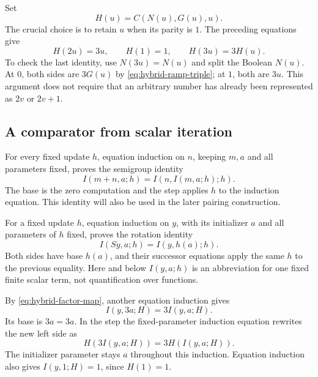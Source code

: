 \documentclass[11pt,a4paper]{article}
\theoremstyle{definition}\newtheorem{definition}[theorem]{Definition}
\begin{document}
Set
\[
 H(u)=C(N(u),G(u),u).
\]
The crucial choice is to retain $u$ when its parity is $1$.
The preceding equations give
\begin{equation}
 H(2u)=3u,\qquad H(1)=1,\qquad H(3u)=3H(u).
 \label{eq:hybrid-factor-map}
\end{equation}
To check the last identity, use $N(3u)=N(u)$ and split the Boolean
$N(u)$.  At $0$, both sides are $3G(u)$ by
\eqref{eq:hybrid-ramp-triple}; at $1$, both are $3u$.
This argument does not require that an arbitrary number has already
been represented as $2v$ or $2v+1$.

\subsection{A comparator from scalar iteration}

For every fixed update $h$, equation induction on $n$, keeping $m,a$
and all parameters fixed, proves the semigroup identity
\[
 I(m+n,a;h)=I(n,I(m,a;h);h).
\]
The base is the zero computation and the step applies $h$ to the
induction equation. This identity will also be used in the later
pairing construction.


For a fixed update $h$, equation induction on $y$, with its initializer
$a$ and all parameters of $h$ fixed, proves the rotation identity
\begin{equation}
 I(Sy,a;h)=I(y,h(a);h).
 \label{eq:hybrid-rotation}
\end{equation}
Both sides have base $h(a)$, and their successor equations apply the
same $h$ to the previous equality.  Here and below $I(y,a;h)$ is
an abbreviation for one fixed finite scalar term, not quantification
over functions.

By \eqref{eq:hybrid-factor-map}, another equation induction gives
\begin{equation}
 I(y,3a;H)=3I(y,a;H).
 \label{eq:hybrid-iterator-scaling}
\end{equation}
Its base is $3a=3a$.  In the step the fixed-parameter induction
equation rewrites the new left side as
\[
 H(3I(y,a;H))=3H(I(y,a;H)).
\]
The initializer parameter stays $a$ throughout this induction.
Equation induction also gives $I(y,1;H)=1$, since $H(1)=1$.
\end{document}
